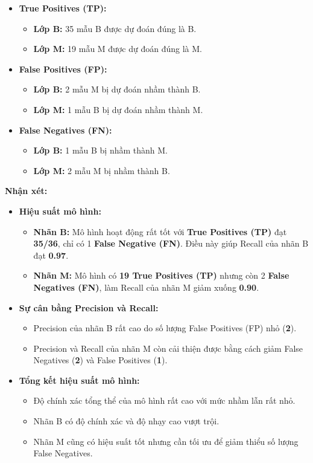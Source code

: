 \begin{itemize}
	\item \textbf{True Positives (TP):}
	\begin{itemize}
		\item \textbf{Lớp B:} 35 mẫu B được dự đoán đúng là B.
		\item \textbf{Lớp M:} 19 mẫu M được dự đoán đúng là M.
	\end{itemize}
	
	\item \textbf{False Positives (FP):}
	\begin{itemize}
		\item \textbf{Lớp B:} 2 mẫu M bị dự đoán nhầm thành B.
		\item \textbf{Lớp M:} 1 mẫu B bị dự đoán nhầm thành M.
	\end{itemize}
	
	\item \textbf{False Negatives (FN):}
	\begin{itemize}
		\item \textbf{Lớp B:} 1 mẫu B bị nhầm thành M.
		\item \textbf{Lớp M:} 2 mẫu M bị nhầm thành B.
	\end{itemize}
\end{itemize}

\textbf{Nhận xét:}
\begin{itemize}
	\item \textbf{Hiệu suất mô hình:}
	\begin{itemize}
		\item \textbf{Nhãn B:} Mô hình hoạt động rất tốt với \textbf{True Positives (TP)} đạt \textbf{35/36}, chỉ có 1 \textbf{False Negative (FN)}. Điều này giúp Recall của nhãn B đạt \textbf{0.97}.
		\item \textbf{Nhãn M:} Mô hình có \textbf{19 True Positives (TP)} nhưng còn 2 \textbf{False Negatives (FN)}, làm Recall của nhãn M giảm xuống \textbf{0.90}.
	\end{itemize}
	
	\item \textbf{Sự cân bằng Precision và Recall:}
	\begin{itemize}
		\item Precision của nhãn B rất cao do số lượng False Positives (FP) nhỏ (\textbf{2}).
		\item Precision và Recall của nhãn M còn cải thiện được bằng cách giảm False Negatives (\textbf{2}) và False Positives (\textbf{1}).
	\end{itemize}
	
	\item \textbf{Tổng kết hiệu suất mô hình:}
	\begin{itemize}
		\item Độ chính xác tổng thể của mô hình rất cao với mức nhầm lẫn rất nhỏ.
		\item Nhãn B có độ chính xác và độ nhạy cao vượt trội.
		\item Nhãn M cũng có hiệu suất tốt nhưng cần tối ưu để giảm thiểu số lượng False Negatives.
	\end{itemize}
\end{itemize}
